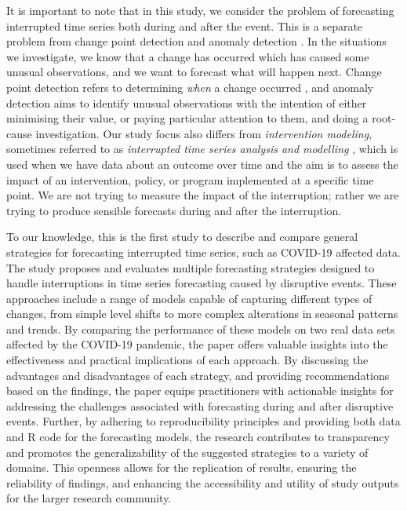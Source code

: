 \documentclass[
  11pt,
  a4paper,
]{article}
\begin{document}
It is important to note that in this study, we consider the problem of
forecasting interrupted time series both during and after the event.
This is a separate problem from change point detection
\autocite{aue2013structural,truong2020selective} and anomaly detection
\autocite{talagala2020anomaly}. In the situations we investigate, we
know that a change has occurred which has caused some unusual
observations, and we want to forecast what will happen next. Change
point detection refers to determining \emph{when} a change occurred
\autocite{blazquez2021review}, and anomaly detection aims to identify
unusual observations with the intention of either minimising their
value, or paying particular attention to them, and doing a root-cause
investigation. Our study focus also differs from \emph{intervention
modeling}, sometimes referred to as \emph{interrupted time series
analysis and modelling} \autocite{mcdowall2019interrupted}, which is
used when we have data about an outcome over time and the aim is to
assess the impact of an intervention, policy, or program implemented at
a specific time point. We are not trying to measure the impact of the
interruption; rather we are trying to produce sensible forecasts during
and after the interruption.

To our knowledge, this is the first study to describe and compare
general strategies for forecasting interrupted time series, such as
COVID-19 affected data. The study proposes and evaluates multiple
forecasting strategies designed to handle interruptions in time series
forecasting caused by disruptive events. These approaches include a
range of models capable of capturing different types of changes, from
simple level shifts to more complex alterations in seasonal patterns and
trends. By comparing the performance of these models on two real data
sets affected by the COVID-19 pandemic, the paper offers valuable
insights into the effectiveness and practical implications of each
approach. By discussing the advantages and disadvantages of each
strategy, and providing recommendations based on the findings, the paper
equips practitioners with actionable insights for addressing the
challenges associated with forecasting during and after disruptive
events. Further, by adhering to reproducibility principles and providing
both data and R code for the forecasting models, the research
contributes to transparency and promotes the generalizability of the
suggested strategies to a variety of domains. This openness allows for
the replication of results, ensuring the reliability of findings, and
enhancing the accessibility and utility of study outputs for the larger
research community.
\end{document}
